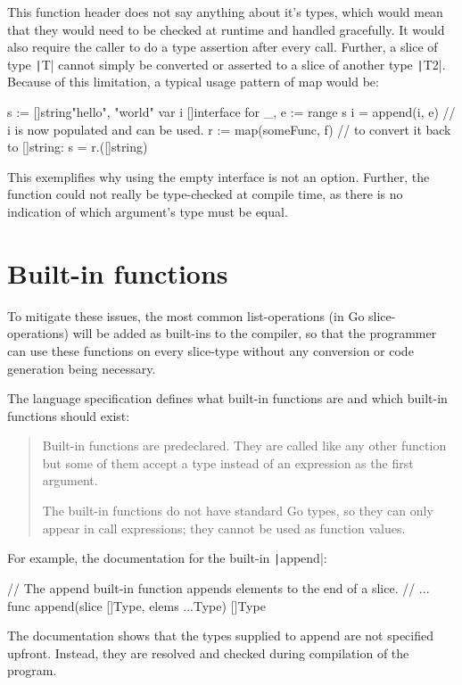 This function header does not say anything about it's types, which would
mean that they would need to be checked at runtime and handled gracefully. It
would also require the caller to do a type assertion after every call. Further,
a slice of type \texttt|T| cannot simply be converted or asserted to a slice of another type
\texttt|T2|\autocite{go-interface-slice-conv}\autocite{go-interface-slice-conv2}.
Because of this limitation, a typical usage pattern of map would be:
\begin{gocode}
s := []string{"hello", "world"}
var i []interface{}
for _, e := range s {
	i = append(i, e)
}
// i is now populated and can be used.
r := map(someFunc, f)
// to convert it back to []string:
s = r.([]string)
\end{gocode}

This exemplifies why using the empty interface is not an option. Further, the
function could not really be type-checked at compile time, as there is no indication
of which argument's type must be equal.

\section{Built-in functions}

To mitigate these issues, the most common list-operations (in Go slice-operations) will
be added as built-ins to the compiler, so that the programmer can use these functions
on every slice-type without any conversion or code generation being necessary.

The language specification defines what built-in functions are and which built-in
functions should exist:
\begin{quote}
    Built-in functions are predeclared. They are called like any other function
    but some of them accept a type instead of an expression as the first argument.

    The built-in functions do not have standard Go types, so they can only appear
    in call expressions; they cannot be used as function values.\autocite{go-spec-builtins}
\end{quote}

For example, the documentation for the built-in \texttt|append|:
\begin{gocode}
// The append built-in function appends elements to the end of a slice.
// ...
func append(slice []Type, elems ...Type) []Type
\end{gocode}

The documentation shows that the types supplied to append are not specified upfront.
Instead, they are resolved and checked during compilation of the program.

